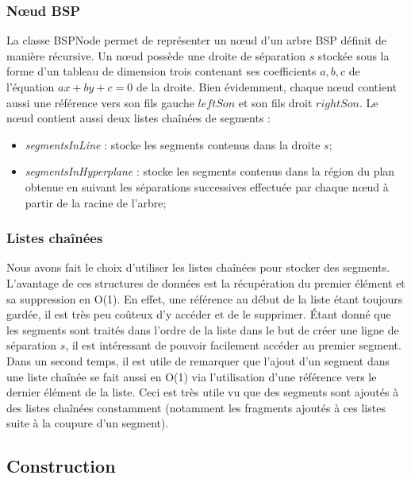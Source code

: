 \documentclass[11pt,a4paper]{article}
\theoremstyle{definition}
\theoremstyle{remark}
\begin{document}
\subsubsection{Nœud BSP} 
La classe BSPNode permet de représenter un nœud d'un arbre BSP définit de manière récursive. Un nœud possède une droite de séparation $s$ stockée sous la forme d'un tableau de dimension trois contenant ses coefficients $a,b,c$ de l'équation $ax + by + c = 0$ de la droite. Bien évidemment, chaque nœud contient aussi une référence vers son fils gauche $leftSon$ et son fils droit $rightSon$. 
Le nœud contient aussi deux listes chaînées de segments :\\

\begin{itemize}
\item \emph{segmentsInLine} : stocke les segments contenus dans la droite $s$;
\item \emph{segmentsInHyperplane} : stocke les segments contenus dans la région du plan obtenue en suivant les séparations successives effectuée par chaque nœud à partir de la racine de l'arbre;
\end{itemize}

\subsubsection{Listes chaînées}

Nous avons fait le choix d'utiliser les listes chaînées pour stocker des segments.\\
L'avantage de ces structures de données est la récupération du premier élément et sa suppression en O(1). En effet, une référence au début de la liste étant toujours gardée, il est très peu coûteux d'y accéder et de le supprimer. Étant donné que les segments sont traités dans l'ordre de la liste dans le but de créer une ligne de séparation $s$, il est intéressant de pouvoir facilement accéder au premier segment.\\
Dans un second temps, il est utile de remarquer que l'ajout d'un segment dans une liste chaînée se fait aussi en O(1) via l'utilisation d'une référence vers le dernier élément de la liste. Ceci est très utile vu que des segments sont ajoutés à des listes chaînées constamment (notamment les fragments ajoutés à ces listes suite à la coupure d'un segment).

\subsection{Construction}
\end{document}
